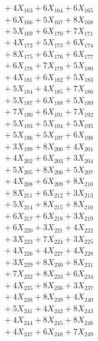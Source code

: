 \documentclass[a4paper,10pt]{article}
\begin{document}
{\begin{align}
&\;  + 4 X_{163} + 6 X_{164} + 6 X_{165} \\[0.3ex]
&\;  + 6 X_{166} + 5 X_{167} + 8 X_{168} \\[0.3ex]
&\;  + 5 X_{169} + 6 X_{170} + 7 X_{171} \\[0.3ex]
&\;  + 4 X_{172} + 5 X_{173} + 6 X_{174} \\[0.3ex]
&\;  + 8 X_{175} + 6 X_{176} + 6 X_{177} \\[0.3ex]
&\;  + 6 X_{178} + 7 X_{179} + 5 X_{180} \\[0.3ex]
&\;  + 4 X_{181} + 6 X_{182} + 5 X_{183} \\[0.3ex]
&\;  + 5 X_{184} + 4 X_{185} + 7 X_{186} \\[0.3ex]
&\;  + 5 X_{187} + 6 X_{188} + 5 X_{189} \\[0.5ex]\allowbreak
&\;  + 7 X_{190} + 6 X_{191} + 7 X_{192} \\[0.3ex]
&\;  + 5 X_{193} + 5 X_{194} + 5 X_{195} \\[0.3ex]
&\;  + 5 X_{196} + 5 X_{197} + 6 X_{198} \\[0.3ex]
&\;  + 3 X_{199} + 8 X_{200} + 4 X_{201} \\[0.3ex]
&\;  + 4 X_{202} + 6 X_{203} + 3 X_{204} \\[0.3ex]
&\;  + 5 X_{205} + 8 X_{206} + 5 X_{207} \\[0.3ex]
&\;  + 4 X_{208} + 6 X_{209} + 8 X_{210} \\[0.3ex]
&\;  + 8 X_{211} + 6 X_{212} + 3 X_{213} \\[0.3ex]
&\;  + 5 X_{214} + 8 X_{215} + 8 X_{216} \\[0.3ex]
&\;  + 6 X_{217} + 6 X_{218} + 3 X_{219} \\[0.5ex]\allowbreak
&\;  + 6 X_{220} + 3 X_{221} + 4 X_{222} \\[0.3ex]
&\;  + 3 X_{223} + 7 X_{224} + 3 X_{225} \\[0.3ex]
&\;  + 4 X_{226} + 4 X_{227} + 4 X_{228} \\[0.3ex]
&\;  + 3 X_{229} + 8 X_{230} + 8 X_{231} \\[0.3ex]
&\;  + 7 X_{232} + 8 X_{233} + 6 X_{234} \\[0.3ex]
&\;  + 4 X_{235} + 8 X_{236} + 3 X_{237} \\[0.3ex]
&\;  + 4 X_{238} + 8 X_{239} + 4 X_{240} \\[0.3ex]
&\;  + 5 X_{241} + 4 X_{242} + 8 X_{243} \\[0.3ex]
&\;  + 4 X_{244} + 8 X_{245} + 8 X_{246} \\[0.3ex]
&\;  + 4 X_{247} + 6 X_{248} + 7 X_{249} \\[0.5ex]\allowbreak

\end{align}}
\end{document}
